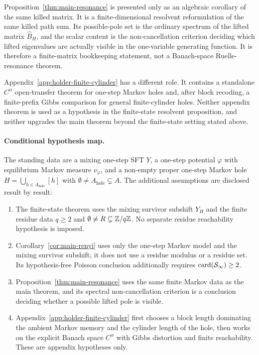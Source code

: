 Proposition~\ref{thm:main-resonance} is presented only as an algebraic
corollary of the same killed matrix.  It is a finite-dimensional
resolvent reformulation of the same killed path sum.  Its possible-pole
set is the ordinary spectrum of the lifted matrix \(\widehat B_H\), and
the scalar content is the non-cancellation criterion deciding which
lifted eigenvalues are actually visible in the one-variable generating
function.  It is therefore a finite-matrix bookkeeping statement, not a
Banach-space Ruelle-resonance theorem.

Appendix~\ref{app:holder-finite-cylinder} has a different role.  It
contains a standalone \(C^\alpha\) open-transfer theorem for one-step
Markov holes and, after block recoding, a finite-prefix Gibbs comparison
for general finite-cylinder holes.  Neither appendix theorem is used as
a hypothesis in the finite-state resolvent proposition, and neither
upgrades the main theorem beyond the finite-state setting stated above.

\paragraph{Conditional hypothesis map.}
The standing data are a mixing one-step SFT \(Y\), a one-step potential
\(\varphi\) with equilibrium Markov measure \(\nu_\varphi\), and a
non-empty proper one-step Markov hole
\(H=\bigcup_{h\in A_{\mathrm{hole}}}[h]\) with
\(\emptyset\neq A_{\mathrm{hole}}\subsetneq A\).  The additional
assumptions are disclosed result by result:
\begin{enumerate}[label=(\roman*)]
  \item The finite-state theorem uses the mixing survivor subshift
  \(Y_H\) and the finite residue data \(q\ge2\) and
  \(\emptyset\neq R\subsetneq\mathbb{Z}/q\mathbb{Z}\).  No separate residue
  reachability hypothesis is imposed.
  \item Corollary~\ref{cor:main-renyi} uses only the one-step Markov
  model and the mixing survivor subshift; it does not use a residue
  modulus or a residue set.  Its hypothesis-free Poisson conclusion
  additionally requires \(\operatorname{card}(\mathcal S_\infty)\geq2\).
  \item Proposition~\ref{thm:main-resonance} uses the same finite Markov
  data as the main theorem, and its spectral non-cancellation criterion
  is a conclusion deciding whether a possible lifted pole is visible.
  \item Appendix~\ref{app:holder-finite-cylinder} first chooses a block
  length dominating the ambient Markov memory and the cylinder length of
  the hole, then works on the explicit Banach space \(C^\alpha\) with
  Gibbs distortion and finite reachability.  These are appendix
  hypotheses only.
\end{enumerate}

